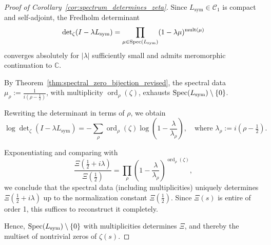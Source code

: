 \begin{proof}[Proof of Corollary~\ref{cor:spectrum_determines_zeta}]
Since \( L_{\mathrm{sym}} \in \mathcal{C}_1 \) is compact and self-adjoint, the Fredholm determinant
\[
\det\nolimits_\zeta(I - \lambda L_{\mathrm{sym}})
= \prod_{\mu \in \operatorname{Spec}(L_{\mathrm{sym}})} (1 - \lambda \mu)^{\operatorname{mult}(\mu)}
\]
converges absolutely for \( |\lambda| \) sufficiently small and admits meromorphic continuation to \( \mathbb{C} \).

By Theorem~\ref{thm:spectral_zero_bijection_revised}, the spectral data \( \mu_\rho := \frac{1}{i(\rho - \tfrac{1}{2})} \), with multiplicity \( \operatorname{ord}_\rho(\zeta) \), exhausts \( \operatorname{Spec}(L_{\mathrm{sym}}) \setminus \{0\} \).

Rewriting the determinant in terms of \( \rho \), we obtain
\[
\log \det\nolimits_\zeta(I - \lambda L_{\mathrm{sym}})
= - \sum_{\rho} \operatorname{ord}_\rho(\zeta) \log\left(1 - \frac{\lambda}{\lambda_\rho} \right),
\quad \text{where } \lambda_\rho := i(\rho - \tfrac{1}{2}).
\]

Exponentiating and comparing with
\[
\frac{\Xi(\tfrac{1}{2} + i\lambda)}{\Xi(\tfrac{1}{2})}
= \prod_{\rho} \left(1 - \frac{\lambda}{\lambda_\rho}\right)^{\operatorname{ord}_\rho(\zeta)},
\]
we conclude that the spectral data (including multiplicities) uniquely determines \( \Xi(\tfrac{1}{2} + i\lambda) \) up to the normalization constant \( \Xi(\tfrac{1}{2}) \). Since \( \Xi(s) \) is entire of order 1, this suffices to reconstruct it completely.

Hence, \( \operatorname{Spec}(L_{\mathrm{sym}}) \setminus \{0\} \) with multiplicities determines \( \Xi \), and thereby the multiset of nontrivial zeros of \( \zeta(s) \).
\end{proof}
%  